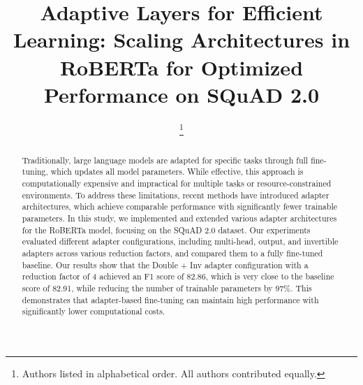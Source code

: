 \documentclass[conference]{IEEEtran}
\begin{document}
\title{Adaptive Layers for Efficient Learning: Scaling Architectures in RoBERTa for Optimized Performance on SQuAD 2.0\*}

\author{
    \thanks{ Authors listed in alphabetical order. All authors contributed equally.}
}

\maketitle


\begin{abstract}

Traditionally, large language models are adapted for specific tasks through full fine-tuning, which updates all model parameters. While effective, this approach is computationally expensive and impractical for multiple tasks or resource-constrained environments. To address these limitations, recent methods have introduced adapter architectures, which achieve comparable performance with significantly fewer trainable parameters. In this study, we implemented and extended various adapter architectures\cite{b3,b7} for the RoBERTa model, focusing on the SQuAD 2.0 dataset. Our experiments evaluated different adapter configurations, including multi-head, output, and invertible adapters across various reduction factors, and compared them to a fully fine-tuned baseline. Our results show that the Double + Inv adapter configuration with a reduction factor of 4 achieved an F1 score of 82.86, which is very close to the baseline score of 82.91, while reducing the number of trainable parameters by 97\%. This demonstrates that adapter-based fine-tuning can maintain high performance with significantly lower computational costs.

\end{abstract}
\end{document}
